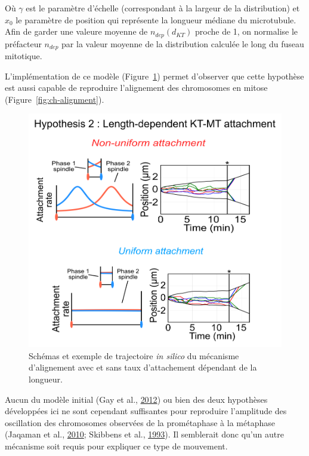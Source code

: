 \documentclass[12pt,a4paper,twoside,openright]{book}
\begin{document}
Où \(\gamma\) est le paramètre d'échelle (correspondant à la largeur de
la distribution) et \(x_0\) le paramètre de position qui représente la
longueur médiane du microtubule. Afin de garder une valeure moyenne de
\(n_{dep}(d_{KT})\) proche de 1, on normalise le préfacteur \(n_{dep}\)
par la valeur moyenne de la distribution calculée le long du fuseau
mitotique.

L'implémentation de ce modèle (Figure~\ref{fig:hyp2}) permet d'observer
que cette hypothèse est aussi capable de reproduire l'alignement des
chromosomes en mitose (Figure~\ref{fig:ch-alignment}).

\begin{figure}[htbp]
\centering
\includegraphics{figures/results/modelling/hyp2.png}
\caption[Second mécanisme expliquant l'alignement des chromosomes]{\label{fig:hyp2}Schémas
et exemple de trajectoire \emph{in silico} du mécanisme d'alignement
avec et sans taux d'attachement dépendant de la longueur.}
\end{figure}

Aucun du modèle initial (Gay et al., \hyperref[ref-Gay2012a]{2012}) ou
bien des deux hypothèses développées ici ne sont cependant suffisantes
pour reproduire l'amplitude des oscillation des chromosomes observées de
la prométaphase à la métaphase (Jaqaman et al.,
\hyperref[ref-Jaqaman2010]{2010}; Skibbens et al.,
\hyperref[ref-Skibbens1993]{1993}). Il semblerait donc qu'un autre
mécanisme soit requis pour expliquer ce type de mouvement.
\end{document}
